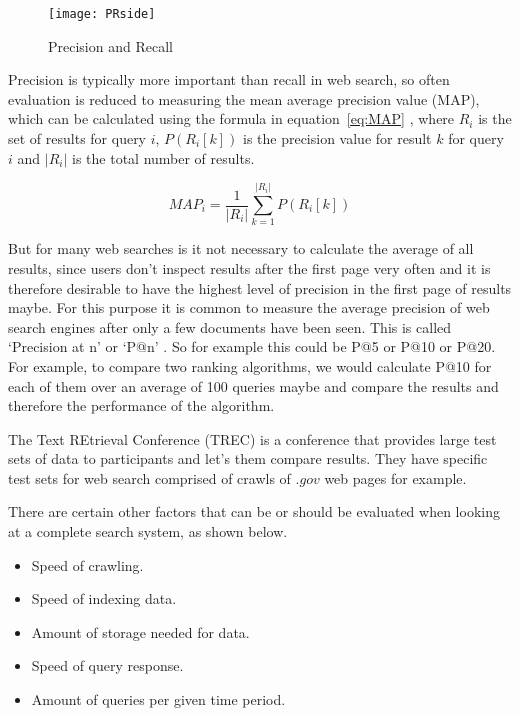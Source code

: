 \begin{figure}[!htbp]
  \centering
  \texttt{[image: PRside]}
  \caption[Precision and Recall]{Precision and Recall \autocite{Wikimedia2014}}
\label{fig:PR}
\end{figure}

Precision is typically more important than recall in web search, so often evaluation is reduced to measuring the mean average precision value (MAP), which can be calculated using the formula in equation~\ref{eq:MAP}\marginnote{$\bm{\Sigma}$~\ref{eq:MAP}} \autocite[p.141]{Baeza-Yates2011}, where $R_i$ is the set of results for query $i$, $P(R_i[k])$ is the precision value for result $k$ for query $i$ and $|R_i|$ is the total number of results.

\begin{equation}
  MAP_i = \frac{1}{|R_i|} \sum_{k=1}^{|R_i|} P(R_i[k])
\label{eq:MAP}
\end{equation}

But for many web searches is it not necessary to calculate the average of all results, since users don't inspect results after the first page very often and it is therefore desirable to have the highest level of precision in the first page of results maybe. For this purpose it is common to measure the average precision of web search engines after only a few documents have been seen. This is called `Precision at n' or `P@n' \autocite[p.140]{Baeza-Yates2011}. So for example this could be P@5 or P@10 or P@20. For example, to compare two ranking algorithms, we would calculate P@10 for each of them over an average of \num{100} queries maybe and compare the results and therefore the performance of the algorithm.

The Text REtrieval Conference (TREC) \autocite{Nist2016} is a conference that provides large test sets of data \autocite{Trec2011} to participants and let's them compare results. They have specific test sets for web search comprised of crawls of $.gov$ web pages for example.

There are certain other factors that can be or should be evaluated when looking at a complete search system, as shown below. 

\begin{itemize}
  \item Speed of crawling.
  \item Speed of indexing data.
  \item Amount of storage needed for data.
  \item Speed of query response.
  \item Amount of queries per given time period.
\end{itemize}

